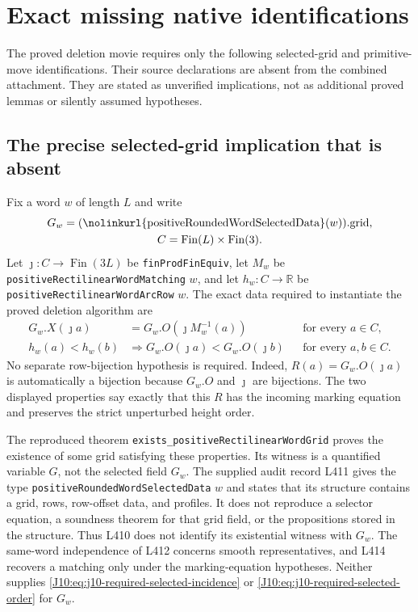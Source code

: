 \documentclass[11pt,oneside]{report}
\theoremstyle{definition}
\numberwithin{equation}{section}
\newcommand{\decl}[1]{\textnormal{\nolinkurl{#1}}}
\begin{document}
\section{Exact missing native identifications}
\label{J10:sec:native-identifications}

The proved deletion movie requires only the following selected-grid and
primitive-move identifications. Their source declarations are absent from
the combined attachment. They are stated as unverified implications,
not as additional proved lemmas or silently assumed hypotheses.

\subsection{The precise selected-grid implication that is absent}

Fix a word $w$ of length $L$ and write
\[
 \begin{gathered}
 G_w=(\decl{positiveRoundedWordSelectedData}(w)).\mathrm{grid},\\
 C=\operatorname{Fin}(L)\times\operatorname{Fin}(3).
 \end{gathered}
\]
Let $\jmath:C\to\operatorname{Fin}(3L)$ be
\decl{finProdFinEquiv}, let $M_w$ be
\decl{positiveRectilinearWordMatching} $w$, and let
$h_w:C\to\mathbb R$ be
\decl{positiveRectilinearWordArcRow} $w$.
The exact data required to instantiate the proved deletion algorithm are
\begin{align}
 G_w.X(\jmath a)&=G_w.O(\jmath M_w^{-1}(a))
       &&\text{for every }a\in C,\label{J10:eq:j10-required-selected-incidence}\\
 h_w(a)<h_w(b)&\Longrightarrow
 G_w.O(\jmath a)<G_w.O(\jmath b)
       &&\text{for every }a,b\in C.\label{J10:eq:j10-required-selected-order}
\end{align}
No separate row-bijection hypothesis is required.
Indeed, $R(a)=G_w.O(\jmath a)$ is automatically a bijection because
$G_w.O$ and $\jmath$ are bijections. The two displayed properties say
exactly that this $R$ has the incoming marking equation and preserves
the strict unperturbed height order.

The reproduced theorem
\decl{exists_positiveRectilinearWordGrid} proves the existence of
some grid satisfying these properties. Its witness is a quantified
variable $G$, not the selected field $G_w$.
The supplied audit record L411 gives the type
\decl{positiveRoundedWordSelectedData} $w$ and states that its
structure contains a grid, rows, row-offset data, and profiles.
It does not reproduce a selector equation, a soundness theorem for
that grid field, or the propositions stored in the structure.
Thus L410 does not identify its existential witness with $G_w$.
The same-word independence of L412 concerns smooth representatives,
and L414 recovers a matching only under the marking-equation hypotheses.
Neither supplies \eqref{J10:eq:j10-required-selected-incidence} or
\eqref{J10:eq:j10-required-selected-order} for $G_w$.
\end{document}
